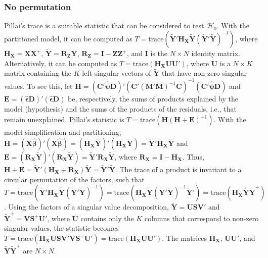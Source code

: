 \subsubsection{No permutation}

Pillai's trace \citep{Pillai1955} is a suitable statistic that can be considered to test $\mathcal{H}_0$. With the partitioned model, it can be computed as $T=\text{trace}(\tilde{\mathbf{Y}}'\mathbf{H}_{\mathbf{X}}\tilde{\mathbf{Y}}(\tilde{\mathbf{Y}}'\tilde{\mathbf{Y}})^{-1})$, where $\mathbf{H}_\mathbf{X}=\mathbf{X}\mathbf{X}^{+}$, $\tilde{\mathbf{Y}}=\mathbf{R}_{\mathbf{Z}}\mathbf{Y}$, $\mathbf{R}_{\mathbf{Z}}=\mathbf{I}-\mathbf{Z}\mathbf{Z}^{+}$, and $\mathbf{I}$ is the $N \times N$ identity matrix. Alternatively, it can be computed as $T=\text{trace}(\mathbf{H}_\mathbf{X}\mathbf{U}\mathbf{U}')$, where $\mathbf{U}$ is a $N \times K$ matrix containing the $K$ left singular vectors of $\tilde{\mathbf{Y}}$ that have non-zero singular values. To see this, let $\mathbf{H} = (\mathbf{C}'\boldsymbol{\hat{\psi}}\mathbf{D})' \left(\mathbf{C}'(\mathbf{M}'\mathbf{M})^{-1}\mathbf{C} \right)^{-1} (\mathbf{C}'\boldsymbol{\hat{\psi}}\mathbf{D})$ and $\mathbf{E} = (\boldsymbol{\hat{\epsilon}}\mathbf{D})'(\boldsymbol{\hat{\epsilon}}\mathbf{D})$ be, respectively, the sums of products explained by the model (hypothesis) and the sums of the products of the residuals, i.e., that remain unexplained. Pillai's statistic is $T=\text{trace}\left(\mathbf{H}(\mathbf{H}+\mathbf{E})^{-1}\right)$. With the model simplification and partitioning, $\mathbf{H}= ( \mathbf{X}\boldsymbol{\hat{\beta}})'(\mathbf{X}\boldsymbol{\hat{\beta}}) = (\mathbf{H}_{\mathbf{X}}\tilde{\mathbf{Y}})'(\mathbf{H}_{\mathbf{X}}\tilde{\mathbf{Y}}) = \tilde{\mathbf{Y}}'\mathbf{H}_{\mathbf{X}}\tilde{\mathbf{Y}}$ and $\mathbf{E} = (\mathbf{R}_{\mathbf{X}}\tilde{\mathbf{Y}})'(\mathbf{R}_{\mathbf{X}}\tilde{\mathbf{Y}}) = \tilde{\mathbf{Y}}'\mathbf{R}_{\mathbf{X}}\tilde{\mathbf{Y}}$, where $\mathbf{R}_{\mathbf{X}} = \mathbf{I} - \mathbf{H}_{\mathbf{X}}$. Thus, $\mathbf{H}+\mathbf{E}= \tilde{\mathbf{Y}}'(\mathbf{H}_{\mathbf{X}} + \mathbf{R}_{\mathbf{X}})\tilde{\mathbf{Y}} = \tilde{\mathbf{Y}}'\tilde{\mathbf{Y}}$. The trace of a product is invariant to a circular permutation of the factors, such that $T = \text{trace}(\tilde{\mathbf{Y}}'\mathbf{H}_{\mathbf{X}}\tilde{\mathbf{Y}}(\tilde{\mathbf{Y}}'\tilde{\mathbf{Y}})^{-1})=\text{trace}(\mathbf{H}_{\mathbf{X}}\tilde{\mathbf{Y}}(\tilde{\mathbf{Y}}'\tilde{\mathbf{Y}})^{-1}\tilde{\mathbf{Y}}')=\text{trace}(\mathbf{H}_{\mathbf{X}}\tilde{\mathbf{Y}}\tilde{\mathbf{Y}}^{+})$. Using the factors of a singular value decomposition, $\tilde{\mathbf{Y}} = \mathbf{U}\mathbf{S}\mathbf{V}'$ and $\tilde{\mathbf{Y}}^{+} = \mathbf{V}\mathbf{S}^{+}\mathbf{U}'$, where $\mathbf{U}$ contains only the $K$ columns that correspond to non-zero singular values, the statistic becomes $T = \text{trace}(\mathbf{H}_{\mathbf{X}}
\mathbf{U}\mathbf{S}\mathbf{V}' \mathbf{V}\mathbf{S}^{+}\mathbf{U}') = \text{trace}(\mathbf{H}_{\mathbf{X}}
\mathbf{U}\mathbf{U}')$. The matrices $\mathbf{H}_{\mathbf{X}}$, $\mathbf{U}\mathbf{U}'$, and $\tilde{\mathbf{Y}}\tilde{\mathbf{Y}}^{+}$ are $N \times N$.

